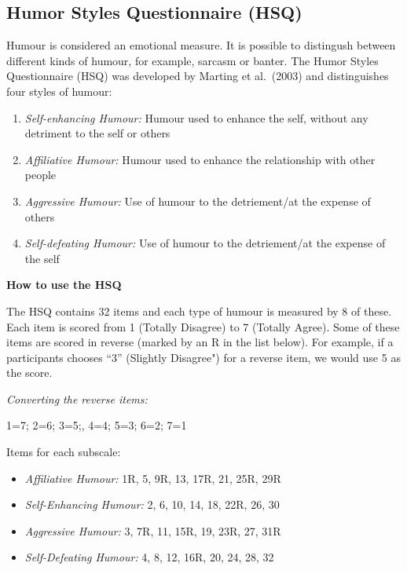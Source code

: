 \documentclass[
]{book}
\providecommand{\tightlist}{%
  \setlength{\itemsep}{0pt}\setlength{\parskip}{0pt}}
\begin{document}
\hypertarget{humor-styles-questionnaire-hsq}{%
\subsection{Humor Styles Questionnaire (HSQ)}\label{humor-styles-questionnaire-hsq}}

Humour is considered an emotional measure. It is possible to distingush between different kinds of humour, for example, sarcasm or banter. The Humor Styles Questionnaire (HSQ) was developed by Marting et al.~(2003) and distinguishes four styles of humour:

\begin{enumerate}
\def\labelenumi{\arabic{enumi}.}
\tightlist
\item
  \emph{Self-enhancing Humour:} Humour used to enhance the self, without any detriment to the self or others
\item
  \emph{Affiliative Humour:} Humour used to enhance the relationship with other people
\item
  \emph{Aggressive Humour:} Use of humour to the detriement/at the expense of others
\item
  \emph{Self-defeating Humour:} Use of humour to the detriement/at the expense of the self
\end{enumerate}

\textbf{How to use the HSQ}

The HSQ contains 32 items and each type of humour is measured by 8 of these. Each item is scored from 1 (Totally Disagree) to 7 (Totally Agree). Some of these items are scored in reverse (marked by an R in the list below). For example, if a participants chooses ``3'' (Slightly Disagree") for a reverse item, we would use 5 as the score.

\emph{Converting the reverse items:}

1=7; 2=6; 3=5;, 4=4; 5=3; 6=2; 7=1

Items for each subscale:

\begin{itemize}
\tightlist
\item
  \emph{Affiliative Humour:} 1R, 5, 9R, 13, 17R, 21, 25R, 29R
\item
  \emph{Self-Enhancing Humour:} 2, 6, 10, 14, 18, 22R, 26, 30
\item
  \emph{Aggressive Humour:} 3, 7R, 11, 15R, 19, 23R, 27, 31R
\item
  \emph{Self-Defeating Humour:} 4, 8, 12, 16R, 20, 24, 28, 32
\end{itemize}
\end{document}
